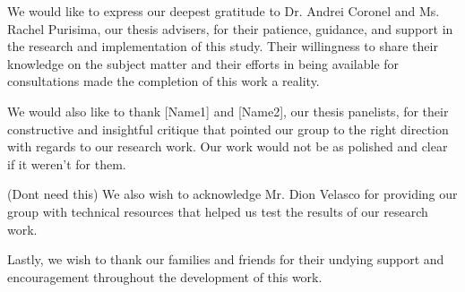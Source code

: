 \begin{acknowledgments}
We would like to express our deepest gratitude to Dr. Andrei Coronel and Ms. Rachel Purisima, our thesis advisers, for their patience, guidance, and support in the research and implementation of this study. Their willingness to share their knowledge on the subject matter and their efforts in being available for consultations made the completion of this work a reality. 

We would also like to thank [Name1] and [Name2], our thesis panelists, for their constructive and insightful critique that pointed our group to the right direction with regards to our research work. Our work would not be as polished and clear if it weren't for them.

(Dont need this) We also wish to acknowledge Mr. Dion Velasco for providing our group with technical resources that helped us test the results of our research work.

Lastly, we wish to thank our families and friends for their undying support and encouragement throughout the development of this work.
\end{acknowledgments}